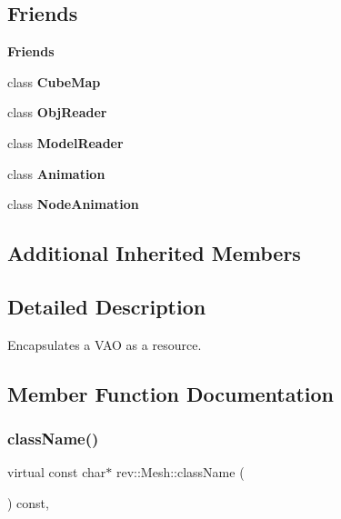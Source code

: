 \subsection*{Friends}
\begin{Indent}\textbf{ Friends}\par
\begin{DoxyCompactItemize}
\item 
\mbox{\label{classrev_1_1_mesh_a83d06bada150194666fdc02c043d1080}} 
class {\bfseries Cube\+Map}
\item 
\mbox{\label{classrev_1_1_mesh_aa89c0df06f5945a12b1d029612d199cd}} 
class {\bfseries Obj\+Reader}
\item 
\mbox{\label{classrev_1_1_mesh_ac3e0a085a76d6fcad904e95ebbe2c6a5}} 
class {\bfseries Model\+Reader}
\item 
\mbox{\label{classrev_1_1_mesh_af47625f50036c466946f960db7320bcf}} 
class {\bfseries Animation}
\item 
\mbox{\label{classrev_1_1_mesh_a395c52c1b342efdb79f36b2d4b2f1565}} 
class {\bfseries Node\+Animation}
\end{DoxyCompactItemize}
\end{Indent}
\subsection*{Additional Inherited Members}


\subsection{Detailed Description}
Encapsulates a V\+AO as a resource. 

\subsection{Member Function Documentation}
\mbox{\label{classrev_1_1_mesh_a4c3c8a3358e75a1821ab11be746a891c}} 
\subsubsection{\texorpdfstring{className()}{className()}}
{\footnotesize\ttfamily virtual const char$\ast$ rev\+::\+Mesh\+::class\+Name (\begin{DoxyParamCaption}{ }\end{DoxyParamCaption}) const\hspace{0.3cm}{\ttfamily [inline]}, {\ttfamily [virtual]}}



